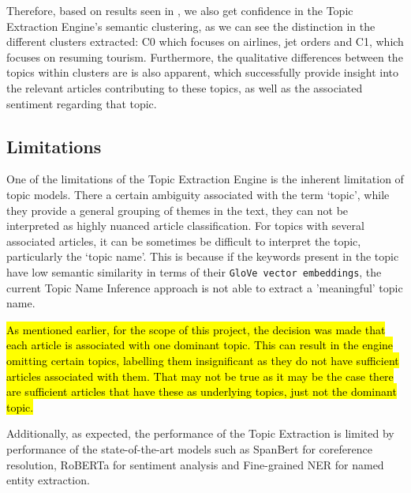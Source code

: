 \vspace{2ex}

Therefore, based on results seen in , we also get confidence in the Topic Extraction Engine's semantic clustering, as we can see the distinction in the different clusters extracted: C0 which focuses on airlines, jet orders and C1, which focuses on resuming tourism.
Furthermore, the qualitative differences between the topics within clusters are is also apparent, which successfully provide insight into the relevant articles contributing to these topics, as well as the associated sentiment regarding that topic.

\subsection*{Limitations}

One of the limitations of the Topic Extraction Engine is the inherent limitation of topic models. There a certain ambiguity associated with the term `topic', while they provide a general grouping of themes in the text, they can not be interpreted as highly nuanced article classification. For topics with several associated articles, it can be sometimes be difficult to interpret the topic, particularly the `topic name'. This is because if the keywords present in the topic have low semantic similarity in terms of their \texttt{GloVe vector embeddings}, the current Topic Name Inference approach is not able to extract a 'meaningful' topic name.

\hl{As mentioned earlier, for the scope of this project, the decision was made that each article is associated with one dominant topic. This can result in the engine omitting certain topics, labelling them insignificant as they do not have sufficient articles associated with them. That may not be true as it may be the case there are sufficient articles that have these as underlying topics, just not the dominant topic.}

Additionally, as expected, the performance of the Topic Extraction is limited by performance of the state-of-the-art models such as SpanBert for coreference resolution, RoBERTa for sentiment analysis and Fine-grained NER for named entity extraction.  